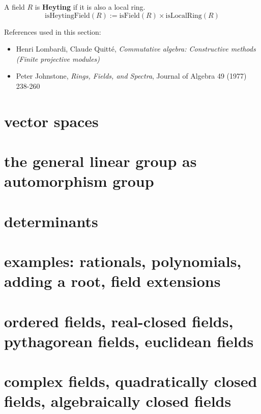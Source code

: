 \begin{definition}
A field $R$ is \textbf{Heyting} if it is also a local ring. 
$$\mathrm{isHeytingField}(R) := \mathrm{isField}(R) \times \mathrm{isLocalRing}(R)$$ 
\end{definition}

References used in this section: 
\begin{itemize}
\item Henri Lombardi, Claude Quitté, \textit{Commutative algebra: Constructive methods (Finite projective modules)}
\item Peter Johnstone, \textit{Rings, Fields, and Spectra}, Journal of Algebra 49 (1977) 238-260
\end{itemize}

\section{vector spaces}
\section{the general linear group as automorphism group}
\section{determinants\titledagger}
\section{examples: rationals, polynomials, adding a root, field extensions}
\section{ordered fields, real-closed fields, pythagorean fields, euclidean fields}
\section{complex fields, quadratically closed fields, algebraically closed fields}

